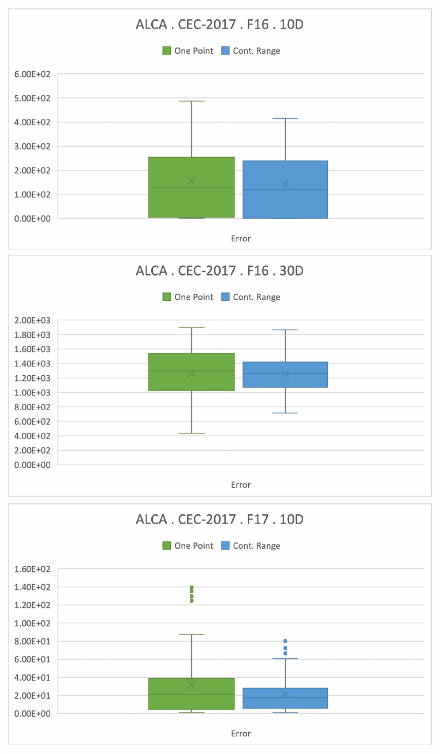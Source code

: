 \documentclass[graybox]{svmult}
\begin{document}
    \begin{figure}[!ht]
        \begin{minipage}[h]{0.49\linewidth}
            \includegraphics[width=1\linewidth]{img/fig_experiment_F16x10D.pdf} 
        \end{minipage}
        \hfill
        \begin{minipage}[h]{0.49\linewidth}
            \includegraphics[width=1\linewidth]{img/fig_experiment_F16x30D.pdf} 
        \end{minipage}
        \vfill
        \vspace{0.05 cm}
        \begin{minipage}[h]{0.49\linewidth}
            \includegraphics[width=1\linewidth]{img/fig_experiment_F17x10D.pdf} 

\end{minipage}
\end{figure}
\end{document}
